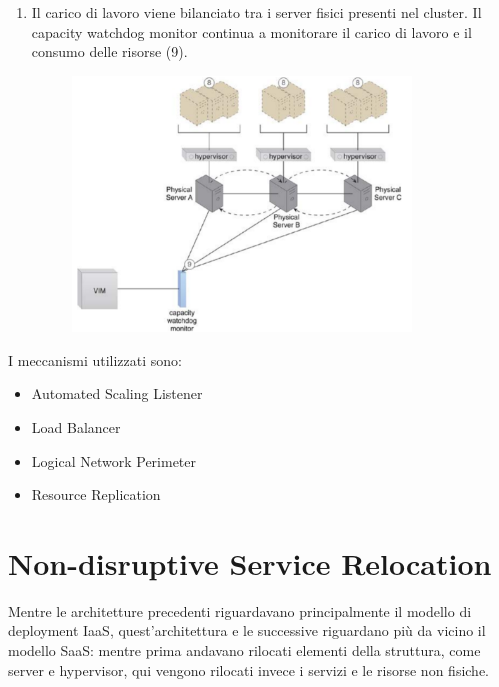 \begin{enumerate}
    \item Il carico di lavoro viene bilanciato tra i server fisici presenti nel cluster. Il capacity watchdog monitor continua a monitorare il carico di lavoro e il consumo delle risorse (9).
    
    \begin{figure}[htb!]
    \centering
    \includegraphics[width=9cm]{./Images/cap12/12.5.png}
    \end{figure}
    
\end{enumerate}

I meccanismi utilizzati sono:
\begin{itemize}
    \item Automated Scaling Listener
    \item Load Balancer
    \item Logical Network Perimeter
    \item Resource Replication
\end{itemize}
\clearpage

\section{Non-disruptive Service Relocation}
Mentre le architetture precedenti riguardavano principalmente il modello di deployment IaaS, quest'architettura e le successive riguardano più da vicino il modello SaaS: mentre prima andavano rilocati elementi della struttura, come server e hypervisor, qui vengono rilocati invece i servizi e le risorse non fisiche.

